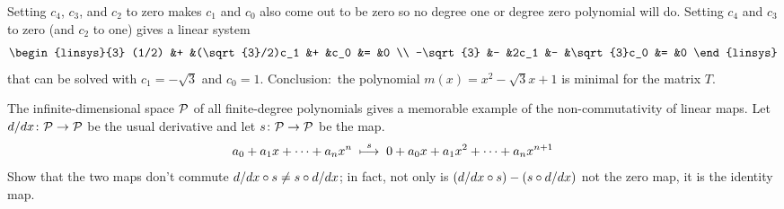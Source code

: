 \begin{exercises}
\begin{answer}
\begin{exparts}
           Setting \( c_4 \), \( c_3 \), and \( c_2 \) to zero 
           makes \( c_1 \) and \( c_0 \) also come out to be zero so
           no degree one or degree zero polynomial will do.
           Setting \( c_4 \) and \( c_3 \) to zero (and $c_2$ to one)
           gives a linear system 
           \begin{equation*}
             \begin{linsys}{3}
               (1/2)     &+  &(\sqrt{3}/2)c_1  &+  &c_0          &=  &0 \\
               -\sqrt{3} &-  &2c_1             &-  &\sqrt{3}c_0  &=  &0
             \end{linsys}
           \end{equation*}
           that can be solved with $c_1=-\sqrt{3}$ and $c_0=1$.
           Conclusion:~the polynomial 
           $m(x)=x^2-\sqrt{3}x+1$
           is minimal for the matrix $T$.
      \end{exparts}  
    \end{answer}
  \item 
    The infinite-dimensional space $\mathcal{P}$ 
    of all finite-degree polynomials
    gives a memorable example of the non-commutativity of
    linear maps.
    Let \( \mbox{$d/dx\colon \mathcal{P}\to \mathcal{P}$} \) be the usual derivative
    and let \( \mbox{$s\colon \mathcal{P}\to \mathcal{P}$} \) be the  map.
    \begin{equation*}
      a_0+a_1x+\dots+a_nx^n
      \;\stackrel{s}{\longmapsto}\;
      0+a_0x+a_1x^2+\dots+a_nx^{n+1}
    \end{equation*}
    Show that the two maps don't commute
    \( d/dx\mathbin\circ s\neq s\mathbin\circ d/dx \); in fact, 
    not only is \( (d/dx\mathbin\circ s)-(s\mathbin\circ d/dx) \) not
    the zero map, it is the identity map.
\end{exercises}
